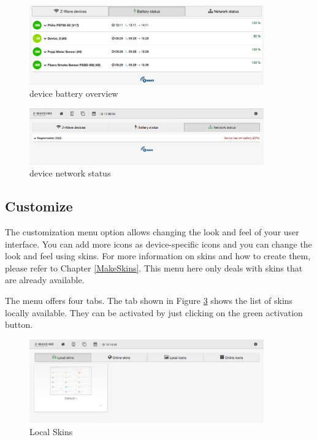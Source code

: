 \begin{figure}
\begin{center}
\includegraphics[width=0.9\textwidth]{pngs/cap4/incl7.png}
\caption{\zwave device battery overview}
\label{incl7}
\end{center}
\end{figure}

\begin{figure}
\begin{center}
\includegraphics[width=0.9\textwidth]{pngs/cap4/incl8.png}
\caption{\zwave device network status}
\label{incl8}
\end{center}
\end{figure}

\subsection{Customize}
\label{customize}


The customization menu option allows changing the look and feel of your \zway user 
interface. You can add more icons as device-specific icons and you can change the look 
and feel using skins. For more information on skins and how to create them, please refer 
to Chapter \ref{MakeSkins}. This menu here only deals with skins that are already available.

The menu offers four tabs. The tab shown in Figure \ref{shui81} shows the list of skins 
locally available. They can be activated by just clicking on the green activation button.

\begin{figure}
\begin{center}
\includegraphics[width=0.9\textwidth]{pngs/cap4/shui81.png}
\caption{Local Skins}
\label{shui81}
\end{center}
\end{figure}

